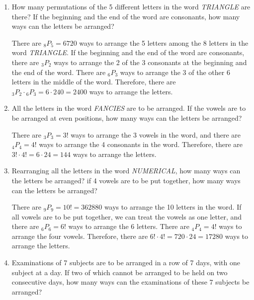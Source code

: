 \documentclass{report}
\newcommand\permtwo[2][^n]{{}_{#1}P_{#2}}
\begin{document}
\begin{multicols}{2}
\begin{enumerate}
    \item How many permutations of the 5 different letters in the word \textit{TRIANGLE}
          are there? If the beginning and the end of the word are consonants, how many
          ways can the letters be arranged? \sol{}

          There are $\permtwo[8]{5} = 6720$ ways to arrange the 5 letters among the 8
          letters in the word \textit{TRIANGLE}. If the beginning and the end of the word
          are consonants, there are $\permtwo[3]{2}$ ways to arrange the 2 of the 3
          consonants at the beginning and the end of the word. There are $\permtwo[6]{3}$
          ways to arrange the 3 of the other 6 letters in the middle of the word.
          Therefore, there are $\permtwo[3]{2} \cdot \permtwo[6]{3} = 6 \cdot 240 = 2400$
          ways to arrange the letters.

    \item All the letters in the word \textit{FANCIES} are to be arranged. If the vowels
          are to be arranged at even positions, how many ways can the letters be
          arranged?

          \sol{}

          There are $\permtwo[3]{3} = 3!$ ways to arrange the 3 vowels in the word, and
          there are $\permtwo[4]{4} = 4!$ ways to arrange the 4 consonants in the word.
          Therefore, there are $3! \cdot 4! = 6 \cdot 24 = 144$ ways to arrange the
          letters.

    \item Rearranging all the letters in the word \textit{NUMERICAL}, how many ways can
          the letters be arranged? if 4 vowels are to be put together, how many ways can
          the letters be arranged?

          \sol{}

          There are $\permtwo[9]{9} = 10! = 362880$ ways to arrange the 10 letters in the
          word. If all vowels are to be put together, we can treat the vowels as one
          letter, and there are $\permtwo[6]{6} = 6!$ ways to arrange the 6 letters.
          There are $\permtwo[4]{4} = 4!$ ways to arrange the four vowels. Therefore,
          there are $6! \cdot 4! = 720 \cdot 24 = 17280$ ways to arrange the letters.

    \item Examinations of 7 subjects are to be arranged in a row of 7 days, with one
          subject at a day. If two of which cannot be arranged to be held on two
          consecutive days, how many ways can the examinations of these 7 subjects be
          arranged? \sol{}


\end{enumerate}
\end{multicols}
\end{document}
